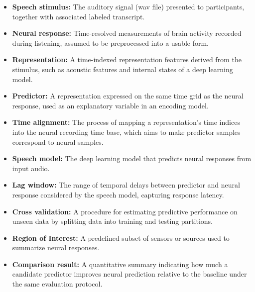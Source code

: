 \documentclass[12pt]{article}
\begin{document}
\begin{itemize}
  \item \textbf{Speech stimulus:} The auditory signal (wav file) presented to participants, together with associated labeled transcript.

  \item \textbf{Neural response:} Time-resolved measurements of brain activity recorded during listening, assumed to be preprocessed into a usable form.

  \item \textbf{Representation:} A time-indexed representation features derived from
  the stimulus, such as acoustic features and internal states of a deep learning model.

  \item \textbf{Predictor:} A representation expressed on the same time grid as
  the neural response, used as an explanatory variable in an encoding model.

  \item \textbf{Time alignment:} The process of mapping a representation’s time
  indices into the neural recording time base, which aims to make predictor samples
  correspond to neural samples.

  \item \textbf{Speech model:} The deep learning model that predicts neural responses from
  input audio.

  \item \textbf{Lag window:} The range of temporal delays between predictor and
  neural response considered by the speech model, capturing response latency.

  \item \textbf{Cross validation:} A procedure for estimating predictive performance on unseen data by splitting data into training and testing partitions.

  \item \textbf{Region of Interest:} A predefined subset of sensors or sources used to summarize neural responses.

  \item \textbf{Comparison result:} A quantitative summary indicating how much
  a candidate predictor improves neural prediction relative to the baseline under the same evaluation protocol.
\end{itemize}
\end{document}
